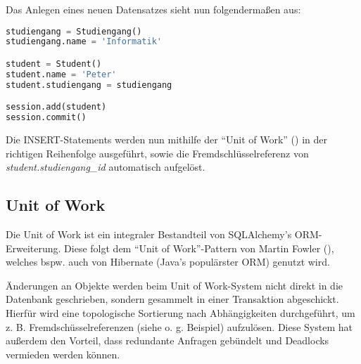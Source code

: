 \hspace{1.0pt}

\noindent
Das Anlegen eines neuen Datensatzes sieht nun folgendermaßen aus:

\begin{lstlisting}[language=Python]
studiengang = Studiengang()
studiengang.name = 'Informatik'

student = Student()
student.name = 'Peter'
student.studiengang = studiengang

session.add(student)
session.commit()
\end{lstlisting}

Die INSERT-Statements werden nun mithilfe der "`Unit of Work"' (\cite[S. 94--95]{Cope1}) in der richtigen Reihenfolge ausgeführt, sowie die Fremdschlüsselreferenz von \textit{student.studiengang\_id} automatisch aufgelöst.

\subsection{Unit of Work}

Die Unit of Work ist ein integraler Bestandteil von SQLAlchemy’s ORM-Erweiterung. Diese folgt dem "`Unit of Work"'-Pattern von Martin Fowler (\cite{Fowl1}), welches bspw. auch von Hibernate (Java’s populärster ORM) genutzt wird.

Änderungen an Objekte werden beim Unit of Work-System nicht direkt in die Datenbank geschrieben, sondern gesammelt in einer Transaktion abgeschickt. Hierfür wird eine topologische Sortierung nach Abhängigkeiten durchgeführt, um z. B. Fremdschüsselreferenzen (siehe o. g. Beispiel) aufzulösen. Diese System hat außerdem den Vorteil, dass redundante Anfragen gebündelt und Deadlocks vermieden werden können.
